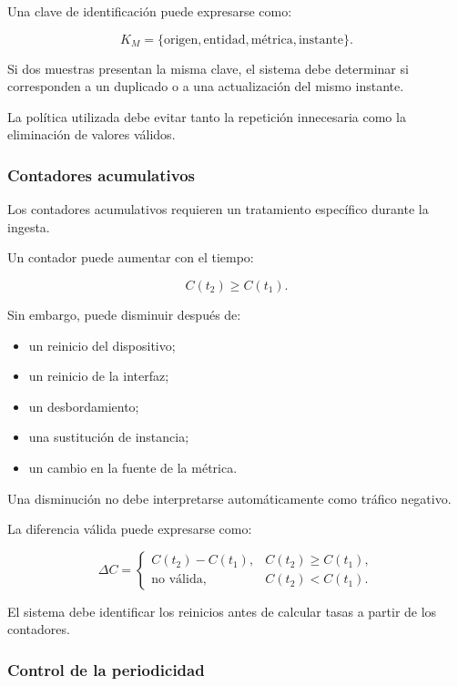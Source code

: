 Una clave de identificación puede expresarse como:

\[
    K_M
    =
    \{
        \text{origen},
        \text{entidad},
        \text{métrica},
        \text{instante}
    \}.
\]

Si dos muestras presentan la misma clave, el sistema debe determinar si
corresponden a un duplicado o a una actualización del mismo instante.

La política utilizada debe evitar tanto la repetición innecesaria como
la eliminación de valores válidos.


\subsubsection*{Contadores acumulativos}

Los contadores acumulativos requieren un tratamiento específico durante
la ingesta.

Un contador puede aumentar con el tiempo:

\[
    C(t_2)
    \geq
    C(t_1).
\]

Sin embargo, puede disminuir después de:

\begin{itemize}
    \item un reinicio del dispositivo;

    \item un reinicio de la interfaz;

    \item un desbordamiento;

    \item una sustitución de instancia;

    \item un cambio en la fuente de la métrica.
\end{itemize}

Una disminución no debe interpretarse automáticamente como tráfico
negativo.

La diferencia válida puede expresarse como:

\[
    \Delta C
    =
    \begin{cases}
        C(t_2)-C(t_1), &
        C(t_2)\geq C(t_1),\\
        \text{no válida}, &
        C(t_2)<C(t_1).
    \end{cases}
\]

El sistema debe identificar los reinicios antes de calcular tasas a
partir de los contadores.


\subsubsection*{Control de la periodicidad}

